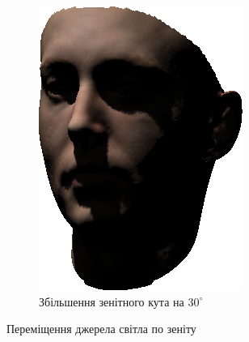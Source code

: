 \begin{figure}[h]
\begin{subfigure}[b]{0.4\textwidth}
    \includegraphics[width=\textwidth]{images/face_shaded_4}
    \caption{Збільшення зенітного кута на $30^{\circ}$}
  \end{subfigure}
  \caption{Переміщення джерела світла по зеніту}
  \label{fig:practice:shadows-angles-zenith}
\end{figure}

